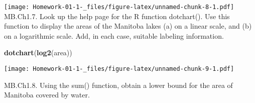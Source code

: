 \documentclass[
]{article}
\newenvironment{Shaded}{\begin{snugshade}}{\end{snugshade}}
\newcommand{\KeywordTok}[1]{\textcolor[rgb]{0.13,0.29,0.53}{\textbf{#1}}}
\newcommand{\NormalTok}[1]{#1}
\begin{document}
\texttt{[image: Homework-01-1-\_files/figure-latex/unnamed-chunk-8-1.pdf]}
MB.Ch1.7. Look up the help page for the R function dotchart(). Use this
function to display the areas of the Manitoba lakes (a) on a linear
scale, and (b) on a logarithmic scale. Add, in each case, suitable
labeling information.

\begin{Shaded}
\begin{Highlighting}[]
\KeywordTok{dotchart}\NormalTok{(}\KeywordTok{log2}\NormalTok{(area))}
\end{Highlighting}
\end{Shaded}

\texttt{[image: Homework-01-1-\_files/figure-latex/unnamed-chunk-9-1.pdf]}

MB.Ch1.8. Using the sum() function, obtain a lower bound for the area of
Manitoba covered by water.
\end{document}
